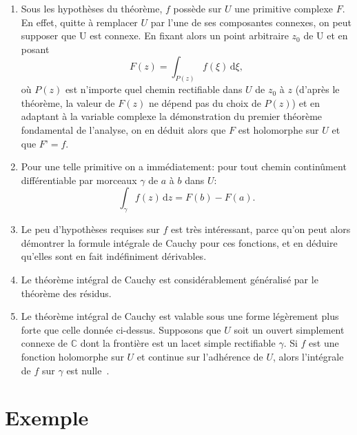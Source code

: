 \documentclass{aomart}
\begin{document}
\begin{enumerate}
\item Sous les hypothèses du théorème, $f$ possède sur $U$ une
  primitive complexe $F$. En effet, quitte à remplacer $U$ par l'une
  de ses composantes connexes, on peut supposer que U est connexe. En
  fixant alors un point arbitraire $z_0$ de U et en posant
  \begin{displaymath}
    F(z)=\int _{{P(z)}}f(\xi )\,{\mathrm  d}\xi ,
  \end{displaymath}
  où $P(z)$ est n'importe quel chemin rectifiable dans $U$ de $z_0$ à
  $z$ (d'après le théorème, la valeur de $F(z)$ ne dépend pas du choix
  de $P(z)$) et en adaptant à la variable complexe la démonstration du
  premier théorème fondamental de l'analyse, on en déduit alors que
  $F$ est holomorphe sur $U$ et que $F’ = f$.


\item Pour une telle primitive on a immédiatement: pour tout chemin
  continûment différentiable par morceaux $\gamma$ de $a$ à $b$ dans
  $U$:
  \begin{displaymath}
    \int _{\gamma }f(z)\,{\mathrm  {d}}z=F(b)-F(a).
  \end{displaymath}

  \item Le peu d'hypothèses requises sur $f$ est très intéressant, parce
    qu'on peut alors démontrer la formule intégrale de Cauchy pour ces
    fonctions, et en déduire qu'elles sont en fait indéfiniment
    dérivables.
    
  \item Le théorème intégral de Cauchy est considérablement généralisé
    par le théorème des résidus.
      
  \item Le théorème intégral de Cauchy est valable sous une forme
    légèrement plus forte que celle donnée ci-dessus. Supposons que
    $U$ soit un ouvert simplement connexe de $\mathbb{C}$ dont la
    frontière est un lacet simple rectifiable $\gamma$. Si $f$ est une
    fonction holomorphe sur $U$ et continue sur l'adhérence de $U$,
    alors l'intégrale de $f$ sur $\gamma$ est nulle~\cite[p.~396
    et~420]{Lin11}.

  \end{enumerate}

\section{Exemple}
\end{document}
